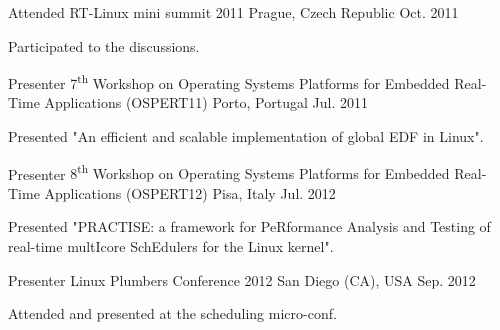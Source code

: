 

\begin{cventries}

  \cventry
    {Attended} %
    {RT-Linux mini summit 2011} %
    {Prague, Czech Republic} %
    {Oct. 2011} %
    {
      \begin{cvitems} %
        \item {Participated to the discussions.}
      \end{cvitems}
    }

  \cventry
    {Presenter} %
    {7\textsuperscript{th} Workshop on Operating Systems Platforms for
	Embedded Real-Time Applications (OSPERT11)} %
    {Porto, Portugal} %
    {Jul. 2011} %
    {
      \begin{cvitems} %
        \item {Presented "An efficient and scalable implementation of global EDF in Linux".}
      \end{cvitems}
    }

  \cventry
    {Presenter} %
    {8\textsuperscript{th} Workshop on Operating Systems Platforms for
	Embedded Real-Time Applications (OSPERT12)} %
    {Pisa, Italy} %
    {Jul. 2012} %
    {
      \begin{cvitems} %
        \item {Presented "PRACTISE: a framework for PeRformance Analysis and
		Testing of real-time multIcore SchEdulers for the Linux kernel".}
      \end{cvitems}
    }
  \cventry
    {Presenter} %
    {Linux Plumbers Conference 2012} %
    {San Diego (CA), USA} %
    {Sep. 2012} %
    {
      \begin{cvitems} %
        \item {Attended and presented at the scheduling micro-conf.}
      \end{cvitems}
    }


\end{cventries}
